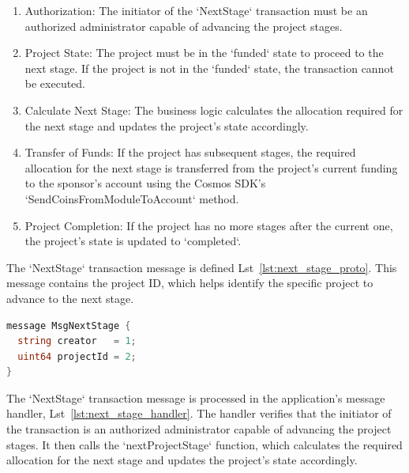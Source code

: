 \begin{enumerate}
  \item Authorization: The initiator of the `NextStage` transaction must be an authorized administrator capable of advancing the project stages.
  \item Project State: The project must be in the `funded` state to proceed to the next stage. If the project is not in the `funded` state, the transaction cannot be executed.
  \item Calculate Next Stage: The business logic calculates the allocation required for the next stage and updates the project's state accordingly.
  \item Transfer of Funds: If the project has subsequent stages, the required allocation for the next stage is transferred from the project's current funding to the sponsor's account using the Cosmos SDK's `SendCoinsFromModuleToAccount` method.
  \item Project Completion: If the project has no more stages after the current one, the project's state is updated to `completed`.
\end{enumerate}

The `NextStage` transaction message is defined Lst~\ref{lst:next_stage_proto}. This message contains the project ID, which helps identify the specific project to advance to the next stage.

\newpage
\begin{lstlisting}[language=go, caption=NextStage protobuf definition,label={lst:next_stage_proto}]
message MsgNextStage {
  string creator   = 1;
  uint64 projectId = 2;
}
\end{lstlisting}

The `NextStage` transaction message is processed in the application's message handler, Lst~\ref{lst:next_stage_handler}. The handler verifies that the initiator of the transaction is an authorized administrator capable of advancing the project stages. It then calls the `nextProjectStage` function, which calculates the required allocation for the next stage and updates the project's state accordingly.


